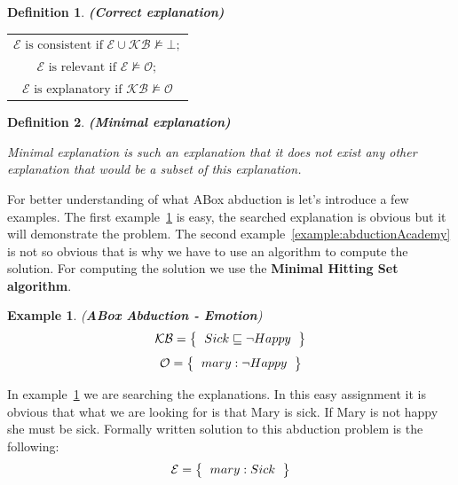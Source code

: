 \documentclass[12pt,a4paper]{article}
\newtheorem{definition}{Definition}[subsection]
\newtheorem{example}{Example}[subsection]
\begin{document}
\begin{definition}{\textbf{(Correct explanation)}}
	\begin{table}[H]
		\centering
		\begin{tabular}{c}
			$\mathcal{E} \text{ is consistent if } \mathcal{E} \cup \mathcal{KB} \not \models \mathcal{\bot};$ \\
			\addlinespace[0.5cm]
			$\mathcal{E} \text{ is relevant if } \mathcal{E} \not \models \mathcal{O};$ \\
			\addlinespace[0.5cm]
			$\mathcal{E} \text{ is explanatory if } \mathcal{KB} \not \models \mathcal{O}$ \\
		\end{tabular}
	\end{table}
\end{definition}

\begin{definition}{\textbf{(Minimal explanation)}}
	
	Minimal explanation is such an explanation that it does not exist any other explanation that would be a subset of this explanation.
\end{definition}

For better understanding of what ABox abduction is let's introduce a few examples. The first example~\ref{example:abductionEmotion} is easy, the searched explanation is obvious but it will demonstrate the problem. The second example~\ref{example:abductionAcademy} is not so obvious that is why we have to use an algorithm to compute the solution. For computing the solution we use the \textbf{Minimal Hitting Set algorithm}.

\newpage
\begin{example}{(\textbf{ABox Abduction - Emotion})}
	\label{example:abductionEmotion}
	\[ 
	\mathcal{KB} = \left\{
	\begin{tabular}{c c}
	$Sick \sqsubseteq \neg Happy$
	\end{tabular}
	\right \}
	\]
	\[ 
	\mathcal{O} = \left\{
	\begin{tabular}{c c}
	$mary : \neg Happy$
	\end{tabular}
	\right \}
	\]								
\end{example}

In example~\ref{example:abductionEmotion} we are searching the explanations. In this easy assignment it is obvious that what we are looking for is that Mary is sick. If Mary is not happy she must be sick. Formally written solution to this abduction problem is the following:
\[ 
\mathcal{E} = \left\{
\begin{tabular}{c c}
$mary : Sick$
\end{tabular}
\right \}
\]
\end{document}
